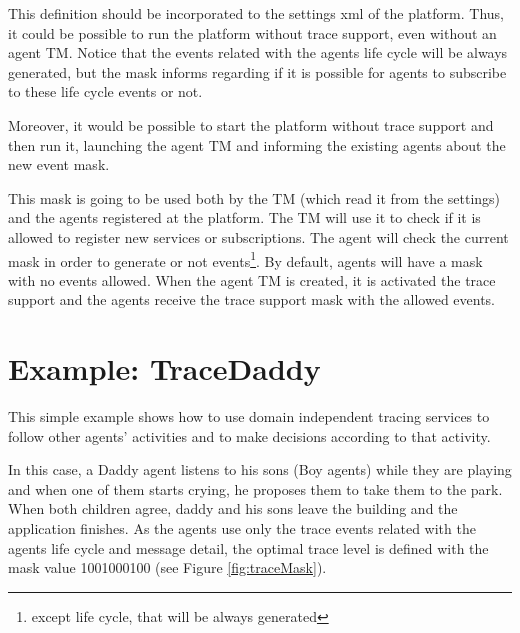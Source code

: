   This definition should be incorporated to the settings xml of the platform.
  Thus, it could be possible to run the platform without trace support, even without an agent TM.
  Notice that the events related with the agents life cycle will be always generated, but the mask
  informs regarding if it is possible for agents to subscribe to these life cycle events or not.

  Moreover, it would be possible to start the platform without trace support and then run it, launching
  the agent TM and informing the existing agents about the new event mask.

  This mask is going to be used both by the TM (which read it from the settings) and the agents registered
  at the platform. The TM will use it to check if it is allowed to register new services or subscriptions.
  The agent will check the current mask in order to generate or not events\footnote{except life cycle, that
  will be always generated}. By default, agents will have a mask with no events allowed. When the agent TM
  is created, it is activated the trace support and the agents receive the trace support mask with the
  allowed events.

\section{Example: TraceDaddy}

	This simple example shows how to use domain independent tracing services to follow other
	agents' activities and to make decisions according to that activity.

	In this case, a Daddy agent listens to his sons (Boy agents) while they are playing and when
	one of them starts crying, he proposes them to take them to the park. When both children
	agree, daddy and his sons leave the building and the application finishes. As the agents use
  only the trace events related with the agents life cycle and message detail, the optimal
  trace level is defined with the mask value 1001000100 (see Figure \ref{fig:traceMask}).

